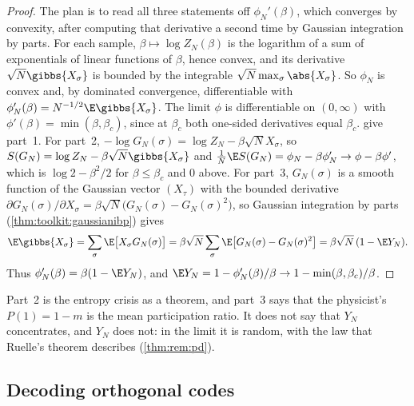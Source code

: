 \begin{refsection}
\begin{proof}
The plan is to read all three statements off $\phi_N'(\beta)$, which converges by convexity, after computing that derivative a second time by Gaussian integration by parts. For each sample, $\beta\mapsto\log Z_N(\beta)$ is the logarithm of a sum of exponentials of linear functions of $\beta$, hence convex, and its derivative $\sqrt N\gibbs{X_\sigma}$ is bounded by the integrable $\sqrt N\max_\sigma\abs{X_\sigma}$. So $\phi_N$ is convex and, by dominated convergence, differentiable with $\phi_N'(\beta)=N^{-1/2}\E\gibbs{X_\sigma}$. The limit $\phi$ is differentiable on $(0,\infty)$ with $\phi'(\beta)=\min(\beta,\beta_c)$, since at $\beta_c$ both one-sided derivatives equal $\beta_c$.  give part~1. For part~2, $-\log G_N(\sigma)=\log Z_N-\beta\sqrt NX_\sigma$, so $S(G_N)=\log Z_N-\beta\sqrt N\gibbs{X_\sigma}$ and $\frac1N\E S(G_N)=\phi_N-\beta\phi_N'\to\phi-\beta\phi'$, which is $\log2-\beta^2/2$ for $\beta\le\beta_c$ and $0$ above. For part~3, $G_N(\sigma)$ is a smooth function of the Gaussian vector $(X_\tau)$ with the bounded derivative $\partial G_N(\sigma)/\partial X_\sigma=\beta\sqrt N\bigl(G_N(\sigma)-G_N(\sigma)^2\bigr)$, so Gaussian integration by parts (\cref{thm:toolkit:gaussianibp}) gives
\[
\E\gibbs{X_\sigma}=\sum_\sigma\E\bigl[X_\sigma G_N(\sigma)\bigr]=\beta\sqrt N\sum_\sigma\E\bigl[G_N(\sigma)-G_N(\sigma)^2\bigr]=\beta\sqrt N\,(1-\E Y_N).
\]
Thus $\phi_N'(\beta)=\beta(1-\E Y_N)$, and $\E Y_N=1-\phi_N'(\beta)/\beta\to1-\min(\beta,\beta_c)/\beta$.
\end{proof}

Part~2 is the entropy crisis as a theorem, and part~3 says that the physicist's $P(1)=1-m$ is the mean participation ratio. It does not say that $Y_N$ concentrates, and $Y_N$ does not: in the limit it is random, with the law that Ruelle's theorem describes (\cref{thm:rem:pd}).

\subsection{Decoding orthogonal codes}\label{sec:rem:decoding}


\end{refsection}
